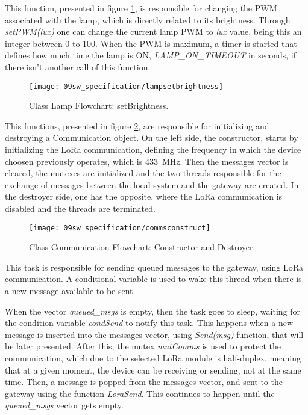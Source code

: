 
This function, presented in figure \ref{fig:flow_setbrightness}, is responsible for changing the PWM associated with the lamp, which is directly related to its brightness. Through \textit{setPWM(lux)} one can change the current lamp PWM to \textit{lux} value, being this an integer between 0 to 100. When the PWM is maximum, a timer is started that defines how much time the lamp is ON, \textit{LAMP\_ON\_TIMEOUT} in seconds, if there isn't another call of this function.

\begin{figure}[H]
	\centering	
	\texttt{[image: 09sw\_specification/lampsetbrightness]}
	\caption{Class Lamp Flowchart: setBrightness.}
	\label{fig:flow_setbrightness}
\end{figure}


\clearpage
{}

This functions, presented in figure \ref{fig:flow_commconstruct}, are responsible for initializing and destroying a Communication object. On the left side, the constructor, starts by initializing the LoRa communication, defining the frequency in which the device choosen previously operates, which is 433~MHz. Then the messages vector is cleared, the mutexes are initialized and the two threads responsible for the exchange of messages between the local system and the gateway are created. In the destroyer side, one has the opposite, where the LoRa communication is disabled and the threads are terminated.

\begin{figure}[H]
	\centering			\texttt{[image: 09sw\_specification/commsconstruct]}
	\caption{Class Communication Flowchart: Constructor and Destroyer.}
	\label{fig:flow_commconstruct}
\end{figure}


This task is responsible for sending queued messages to the gateway, using LoRa communication. A conditional variable is used to wake this thread when there is a new message available to be sent.

When the vector \textit{queued\_msgs} is empty, then the task goes to sleep, waiting for the condition variable \textit{condSend} to notify this task. This happens when a new message is inserted into the messages vector, using \textit{Send(msg)} function, that will be later presented. After this, the mutex \textit{mutComms} is used to protect the communication, which due to the selected LoRa module is half-duplex, meaning that at a given moment, the device can be receiving or sending, not at the same time. Then, a message is popped from the messages vector, and sent to the gateway using the function \textit{LoraSend}. This continues to happen until the \textit{queued\_msgs} vector gets empty.

